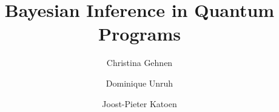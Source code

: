 \documentclass[a4paper,UKenglish,cleveref, autoref, thm-restate]{lipics-v2021}
\title{Bayesian Inference in Quantum Programs}
\author{Christina Gehnen}{RWTH Aachen University, Germany }{christina.gehnen@cs.rwth-aachen.de}{https://orcid.org/0000-0002-6548-3432}{}
\author{Dominique Unruh}{RWTH Aachen University, Germany}{cqwp.uxhird@rwth.unruh.de}{https://orcid.org/0000-0001-8965-1931}{}
\author{Joost-Pieter Katoen}{RWTH Aachen University, Germany}{katoen@cs.rwth-aachen.de}{https://orcid.org/0000-0002-6143-1926}{}
\begin{document}
\clearpage{}\newcommand*{\density}{\densitygen{\mathcal{H}} }
\newcommand*{\densityFull}{\mathcal{D}(\mathcal{H})}
\newcommand*{\densitygen}[1]{\mathcal{D}^- (#1)}
\newcommand*{\traceclass}{T(\mathcal{H})}
\newcommand*{\bounded}{B(\mathcal{H})}

\newcommand*{\predicate}{\predicategen{\mathcal{H}}}
\newcommand*{\predicategen}[1]{\mathcal{P}(#1)}



\newcommand*{\hoare}[3]{\{#1\} #2 \{#3\}}

\newcommand*{\semantics}[1]{\llbracket #1 \rrbracket}
\newcommand*{\semanticsOriginal}[1]{\semantics{#1}_{og}}
\newcommand*{\semanticsRho}[1]{\semantics{#1}_{\rho}}
\newcommand*{\semanticsErr}[1]{\semantics{#1}_{\lightning}}
\newcommand*{\semanticsRhoSingle}[1]{\semantics{#1}_{\tilde{\rho}}}

\newcommand*{\R}{\mathbb{R}}
\newcommand*{\C}{\mathbb{C}}

\newcommand*{\skipbf}{\mathbf{skip}}
\newcommand*{\qzero}{q:=0}
\newcommand*{\Uq}{\overline{q}:= U\overline{q}}
\newcommand*{\observe}{\mathbf{observe } \text{ }(\Bar{q},O)}
\newcommand*{\measure}{\mathbf{measure } \text{ }M[\Bar{q}]:\Bar{S}}
\newcommand*{\measurePrime}{\mathbf{measure } \text{ }M[\Bar{q}]:\Bar{S'}}
\newcommand*{\concat}{S_1;S_2}
\newcommand*{\while}{\mathbf{while } \text{ }M[\Bar{q}]=1 \text{ }\mathbf{ do } \text{ }S}
\newcommand*{\ifstatement}[2]{\mathbf{if} \text{ }M[\Bar{q}]=1 \text{ } \mathbf{then} \text{ } #1 \text{ } \mathbf{else} \text{ } #2}

\newcommand*{\qwp}[2]{qwp\llbracket #1 \rrbracket (#2)}
\newcommand*{\qwlp}[2]{qwlp\llbracket #1 \rrbracket (#2)}
\newcommand*{\qcwp}[2]{qcwp\llbracket #1 \rrbracket (#2)}
\newcommand*{\qcwlp}[2]{qcwlp\llbracket #1 \rrbracket (#2)}

\newcommand*{\intType}{\mathit{Int}}
\newcommand*{\boolType}{\mathit{Bool}}

\newcommand*{\emptyProgram}{\downarrow}
\newcommand*{\config}[2]{\langle #1 , #2 \rangle}
\newcommand*{\errConfig}{\langle \lightning \rangle}
\newcommand*{\setConfig}[0]{\mathcal{C}(\mathcal{H})}
\newcommand*{\termConfig}[0]{\langle sink \rangle} 

\newcommand*{\rewardMC}[3]{\mathfrak{R}_{#1}^{#2}\llbracket #3 \rrbracket}
\newcommand*{\operationalMC}[2]{\mathfrak{R}_{#1}\llbracket #2 \rrbracket}
\newcommand*{\prob}[2]{Pr^{#1}(#2)}

\newcommand*{\eventually}[0]{\lozenge}

\newcommand*{\paths}{\mathit{Paths}}
\newcommand*{\pathsFin}{\paths_{\mathit{fin}}}
\newcommand*{\mc}{\mathcal{M}}
\newcommand*{\densityNumberPairs}{\mathcal{D}\mathcal{R}}
\newcommand*{\states}{\Sigma}
\end{document}
